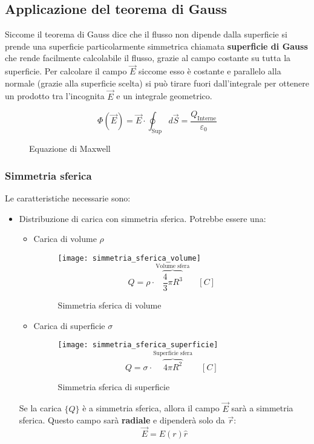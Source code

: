\documentclass[a4paper]{article}
\begin{document}
\subsection{Applicazione del teorema di Gauss}
Siccome il teorema di Gauss dice che il flusso non dipende dalla superficie si prende
una superficie particolarmente simmetrica chiamata \textbf{superficie di Gauss} che
rende facilmente calcolabile il flusso, grazie al campo costante su tutta la superficie.
Per calcolare il campo \( \vec{E} \) siccome esso è costante e parallelo alla normale
(grazie alla superficie scelta) si può tirare fuori dall'integrale per ottenere un
prodotto tra l'incognita \( \vec{E} \) e un integrale geometrico.
\begin{figure}[H]
  \[
    \Phi (\vec{E}) = \vec{E} \cdot \oint_{\text{Sup}} d \vec{S} =
    \frac{Q_{\text{Interne}}}{\varepsilon_0}
  \] 
  \caption{Equazione di Maxwell}
\end{figure}
\subsubsection{Simmetria sferica}
Le caratteristiche necessarie sono:
\begin{itemize}
  \item Distribuzione di carica con simmetria sferica. Potrebbe essere una:
    \begin{itemize}
      \item Carica di volume \( \rho \)
        \begin{figure}[H]
          \centering
          \texttt{[image: simmetria\_sferica\_volume]}
          \[
            Q = \rho \cdot \overbrace{\frac{4}{3}\pi R^3}^{\text{Volume sfera}}
            \quad \left[C\right]
          \] 
          \caption{Simmetria sferica di volume}
        \end{figure}
      \item Carica di superficie \( \sigma \)
        \begin{figure}[H]
          \centering
          \texttt{[image: simmetria\_sferica\_superficie]}
          \[
            Q = \sigma \cdot \overbrace{4 \pi R^2}^{\text{Superficie sfera}}
            \quad \left[C\right]
          \] 
          \caption{Simmetria sferica di superficie}
        \end{figure}
    \end{itemize}
    Se la carica \( \{Q\} \) è a simmetria sferica, allora il campo \( \vec{E} \) sarà
    a simmetria sferica. Questo campo sarà \textbf{radiale} e dipenderà solo da \( \vec{r} \):
    \[
      \vec{E} = E(r) \hat{r}
    \] 
\end{itemize}
\end{document}
